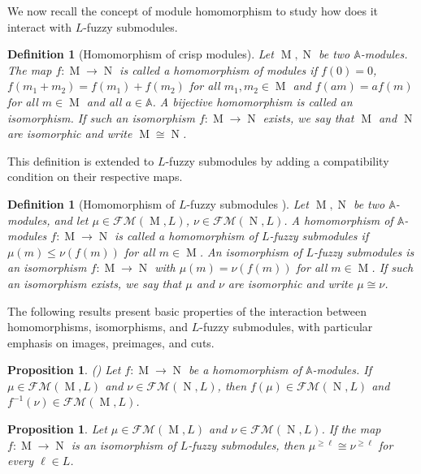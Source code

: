 \documentclass[a4paper,10pt]{article}
\newtheorem{definition}[theorem]{Definition}
\newtheorem{proposition}[theorem]{Proposition}
\newcommand{\bba}{\mathbb{A}}
\newcommand{\calfm}{\mathcal{F\!M}}
\DeclareMathOperator{\Mo}{M}
\DeclareMathOperator{\No}{N}
\begin{document}
We now recall the concept of module homomorphism to study how does it interact with \(L\)-fuzzy submodules.

\begin{definition}[Homomorphism of crisp modules]
\label{def:homomorphism}
Let \(\Mo, \No\) be two \(\bba\)-modules. The map \(f:\Mo \to \No\) is called a \emph{homomorphism of modules} if \(f(0)=0\), \(f(m_1+m_2)=f(m_1)+f(m_2)\) for all \(m_1,m_2 \in \Mo\) and \(f(am)=af(m)\) for all \(m \in \Mo\) and all \(a \in \bba\). A bijective homomorphism is called an \emph{isomorphism}. If such an isomorphism \(f: \Mo \to \No\) exists, we say that \(\Mo\) and \(\No\) are \emph{isomorphic} and write \(\Mo \cong \No\).
\end{definition}

This definition is extended to \(L\)-fuzzy submodules by adding a compatibility condition on their respective maps.

\begin{definition}[Homomorphism of \(L\)-fuzzy submodules \cite{pan1987fuzzy}]
\label{def:lfuzzyhomomorphism}
Let \(\Mo, \No\) be two \(\bba\)-modules, and let \(\mu \in \calfm(\Mo,L)\), \(\nu \in \calfm(\No,L)\). 
A homomorphism of \(\bba\)-modules \(f:\Mo \to \No\) is called a \emph{homomorphism of \(L\)-fuzzy submodules} if \(\mu (m) \leq \nu(f(m))\) for all \(m \in \Mo\). 
An \emph{isomorphism of \(L\)-fuzzy submodules} is an isomorphism \(f:\Mo \to \No\) with \(\mu (m) = \nu(f(m))\) for all \(m \in \Mo\). If such an isomorphism exists, we say that \(\mu\) and \(\nu\) are \emph{isomorphic} and write \(\mu \cong \nu\).
\end{definition}

The following results present basic properties of the interaction between homomorphisms, isomorphisms, and \(L\)-fuzzy submodules, with particular emphasis on images, preimages, and cuts.

\begin{proposition}(\cite{zahedi1993some})
\label{prop:extension_submodules}
Let \(f : \Mo \to \No\) be a homomorphism of \(\bba\)-modules. If \(\mu \in \calfm(\Mo, L)\) and \(\nu \in \calfm(\No, L)\), then \(f(\mu) \in \calfm(\No, L)\) and \(f^{-1}(\nu) \in \calfm(\Mo, L)\).
\end{proposition}

\begin{proposition}
\label{prop:level_iso}
Let \(\mu \in \calfm(\Mo,L)\) and \(\nu \in \calfm(\No,L)\). If the map \(f: \Mo \to \No\) is an isomorphism of \(L\)-fuzzy submodules, then \(\mu^{\geq \ell}\cong\nu^{\geq \ell}\) for every \(\ell \in L\).
\end{proposition}
\end{document}
